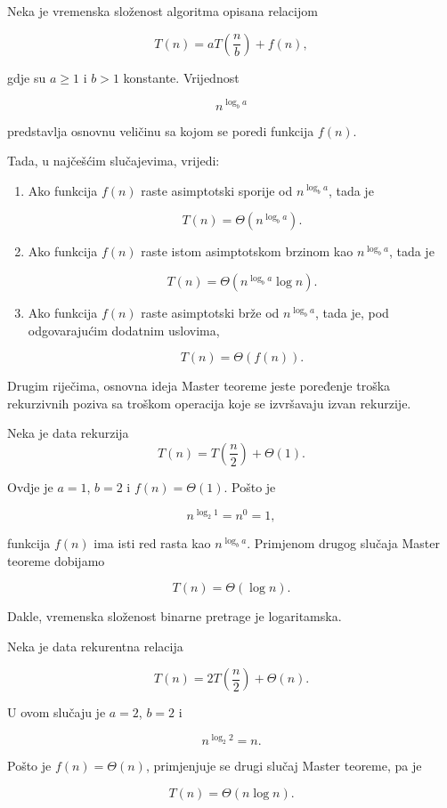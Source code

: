 \begin{theorem}
	Neka je vremenska složenost algoritma opisana relacijom
	
	\[
	T(n)=aT\left(\frac{n}{b}\right)+f(n),
	\]
	
	gdje su $a\geq 1$ i $b>1$ konstante. Vrijednost
	
	\[
	n^{\log_b a}
	\]
	
	predstavlja osnovnu veličinu sa kojom se poredi funkcija $f(n)$.
	
	Tada, u najčešćim slučajevima, vrijedi:
	
	\begin{enumerate}
		\item Ako funkcija $f(n)$ raste asimptotski sporije od
		$n^{\log_b a}$, tada je
		
		\[
		T(n)=\Theta\left(n^{\log_b a}\right).
		\]
		
		\item Ako funkcija $f(n)$ raste istom asimptotskom brzinom kao
		$n^{\log_b a}$, tada je
		
		\[
		T(n)=\Theta\left(n^{\log_b a}\log n\right).
		\]
		
		\item Ako funkcija $f(n)$ raste asimptotski brže od
		$n^{\log_b a}$, tada je, pod odgovarajućim dodatnim uslovima,
		
		\[
		T(n)=\Theta(f(n)).
		\]
	\end{enumerate}
\end{theorem}

Drugim riječima, osnovna ideja Master teoreme jeste poređenje troška
rekurzivnih poziva sa troškom operacija koje se izvršavaju izvan rekurzije.

\begin{example}
	 Neka je data rekurzija
	\[
	T(n)=T\left(\frac{n}{2}\right)+\Theta(1).
	\]
	
	Ovdje je $a=1$, $b=2$ i $f(n)=\Theta(1)$. Pošto je
	
	\[
	n^{\log_2 1}=n^0=1,
	\]
	
	funkcija $f(n)$ ima isti red rasta kao $n^{\log_b a}$. Primjenom drugog
	slučaja Master teoreme dobijamo
	
	\[
	T(n)=\Theta(\log n).
	\]
	
	Dakle, vremenska složenost binarne pretrage je logaritamska.
\end{example}

\begin{example}
Neka je data rekurentna relacija
	
	\[
	T(n)=2T\left(\frac{n}{2}\right)+\Theta(n).
	\]
	
	U ovom slučaju je $a=2$, $b=2$ i
	
	\[
	n^{\log_2 2}=n.
	\]
	
	Pošto je $f(n)=\Theta(n)$, primjenjuje se drugi slučaj Master teoreme, pa je
	
	\[
	T(n)=\Theta(n\log n).
	\]
\end{example}

